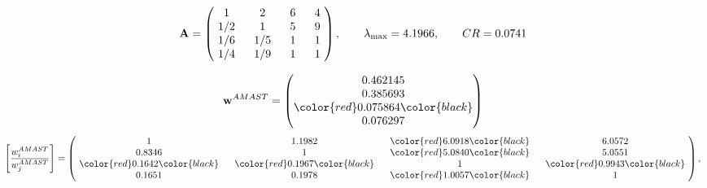 \begin{example}
\begin{equation*}
\mathbf{A} =
\begin{pmatrix}
$\,\,$ 1 $\,\,$ & $\,\,$2$\,\,$ & $\,\,$6$\,\,$ & $\,\,$4 $\,\,$ \\
$\,\,$ 1/2$\,\,$ & $\,\,$ 1 $\,\,$ & $\,\,$5$\,\,$ & $\,\,$9 $\,\,$ \\
$\,\,$ 1/6$\,\,$ & $\,\,$ 1/5$\,\,$ & $\,\,$ 1 $\,\,$ & $\,\,$1 $\,\,$ \\
$\,\,$ 1/4$\,\,$ & $\,\,$ 1/9$\,\,$ & $\,\,$ 1 $\,\,$ & $\,\,$ 1  $\,\,$ \\
\end{pmatrix},
\qquad
\lambda_{\max} =
4.1966,
\qquad
CR = 0.0741
\end{equation*}

\begin{equation*}
\mathbf{w}^{AMAST} =
\begin{pmatrix}
0.462145\\
0.385693\\
\color{red} 0.075864\color{black} \\
0.076297
\end{pmatrix}\end{equation*}
\begin{equation*}
\left[ \frac{{w}^{AMAST}_i}{{w}^{AMAST}_j} \right] =
\begin{pmatrix}
$\,\,$ 1 $\,\,$ & $\,\,$1.1982$\,\,$ & $\,\,$\color{red} 6.0918\color{black} $\,\,$ & $\,\,$6.0572$\,\,$ \\
$\,\,$0.8346$\,\,$ & $\,\,$ 1 $\,\,$ & $\,\,$\color{red} 5.0840\color{black} $\,\,$ & $\,\,$5.0551  $\,\,$ \\
$\,\,$\color{red} 0.1642\color{black} $\,\,$ & $\,\,$\color{red} 0.1967\color{black} $\,\,$ & $\,\,$ 1 $\,\,$ & $\,\,$\color{red} 0.9943\color{black}  $\,\,$ \\
$\,\,$0.1651$\,\,$ & $\,\,$0.1978$\,\,$ & $\,\,$\color{red} 1.0057\color{black} $\,\,$ & $\,\,$ 1  $\,\,$ \\
\end{pmatrix},
\end{equation*}


\end{example}
